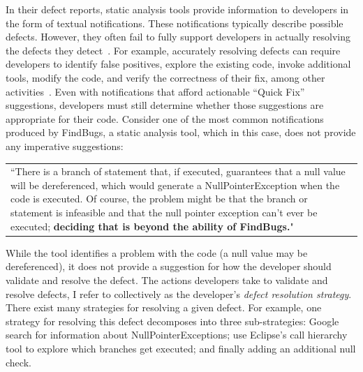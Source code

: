 \documentclass{sig-alternate}
\begin{document}
In their defect reports, static analysis tools provide information to developers in the form of textual notifications.
These notifications typically describe possible defects.
However, they often fail to fully support developers in actually resolving the defects they detect~\cite{Johnson2013}.
For example, accurately resolving defects can require developers to identify false positives, explore the existing code, invoke additional tools, modify the code, and verify the correctness of their fix, among other activities~\cite{Smith2015}.  
Even with notifications that afford actionable ``Quick Fix'' suggestions, developers must still determine whether those suggestions are appropriate for their code.
Consider one of the most common \cite{Ayewah2007} notifications produced by FindBugs, a static analysis tool, which in this case, does not provide any imperative suggestions:


\vspace{2mm}

\begin{tabular}{|p{7.5cm}}
	``There is a branch of statement that, if executed, guarantees that a null value will be dereferenced, which would generate a NullPointerException when the code is executed. Of course, the problem might be that the branch or statement is infeasible and that the null pointer exception can't ever be executed; \textbf{deciding that is beyond the ability of FindBugs.}"\\
\end{tabular}
\vspace{2mm}

\noindent
While the tool identifies a problem with the code (a null value may be dereferenced), it does not provide a suggestion for how the developer should validate and resolve the defect.
The actions developers take to validate and resolve defects, I refer to collectively as the developer's \textit{defect resolution strategy}.
There exist many strategies for resolving a given defect.
For example, one strategy for resolving this defect decomposes into three sub-strategies: Google search for information about NullPointerExceptions; use Eclipse's call hierarchy tool to explore which branches get executed; and finally adding an additional null check.
\end{document}
